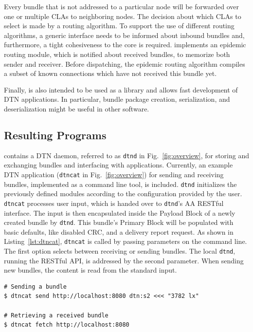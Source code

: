 Every bundle that is not addressed to a particular node will be forwarded over one or multiple CLAs to neighboring nodes.
The decision about which CLAs to select is made by a routing algorithm.
To support the use of different routing algorithms, a generic interface needs to be informed about inbound bundles and, furthermore, a tight cohesiveness to the core is required.
\dtn implements an epidemic routing module, which is notified about received bundles, to memorize both sender and receiver.
Before dispatching, the epidemic routing algorithm compiles a subset of known connections which have not received this bundle yet.

Finally, \dtn is also intended to be used as a library and allows fast development of DTN applications. In particular, bundle package creation, serialization, and deserialization  might be useful in other software.


\subsection{Resulting Programs}

\dtn contains a DTN daemon, referred to as \texttt{dtnd} in Fig.~\ref{fig:overview}, for storing and exchanging bundles and interfacing with applications. Currently, an example DTN application (\texttt{dtncat} in Fig.~\ref{fig:overview}) for sending and receiving bundles, implemented as a command line tool, is included. 
\texttt{dtnd} initializes the previously defined modules according to the configuration provided by the user.
\texttt{dtncat} processes user input, which is handed over to \texttt{dtnd}'s AA RESTful interface.
The input is then encapsulated inside the Payload Block of a newly created bundle by \texttt{dtnd}. This bundle's Primary Block will be populated with basic defaults, like disabled CRC, and a delivery report request.
As shown in Listing~\ref{lst:dtncat}, \texttt{dtncat} is called by passing parameters on the command line. 
The first option selects between receiving or sending bundles.
The local \texttt{dtnd}, running the RESTful API, is addressed by the second parameter. 
When sending new bundles, the content is read from the standard input.

\begin{lstlisting}[caption={\texttt{dtncat} example}, captionpos={b}, label={lst:dtncat}]
# Sending a bundle
$ dtncat send http://localhost:8080 dtn:s2 <<< "3782 lx"

# Retrieving a received bundle 
$ dtncat fetch http://localhost:8080 
\end{lstlisting}

